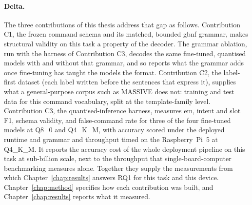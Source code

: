 \paragraph{Delta.} The three contributions of this thesis address that gap as follows.
Contribution C1, the frozen command schema and its matched, bounded \gls{gbnf} grammar, makes
structural validity on this task a property of the decoder. The grammar ablation, run with the
harness of Contribution C3, decodes the same fine-tuned, quantised models with and without that
grammar, and so reports what the grammar adds once fine-tuning has taught the models the format.
Contribution C2, the label-first dataset (each label written before the sentences that express
it), supplies what a general-purpose corpus such as MASSIVE does not: training and test data for
this command vocabulary, split at the template-family level. Contribution C3, the
quantised-inference harness, measures \gls{em}, intent and slot F1, schema validity, and
false-command rate for three of the four fine-tuned models at Q8\_0 and Q4\_K\_M, with accuracy
scored under the deployed runtime and grammar and throughput timed on the Raspberry~Pi~5 at
Q4\_K\_M. It reports the accuracy cost of the whole deployment pipeline on this task at
sub-billion scale, next to the throughput that single-board-computer benchmarking measures alone.
Together they supply the measurements from which Chapter~\ref{chap:results} answers RQ1 for this
task and this device. Chapter~\ref{chap:method} specifies how
each contribution was built, and Chapter~\ref{chap:results} reports what it measured.
